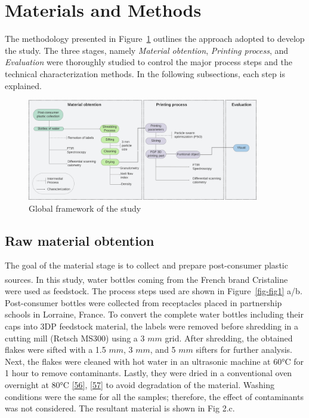 \documentclass[
]{article}
\begin{document}
\hypertarget{materials-and-methods}{%
\section{Materials and Methods}\label{materials-and-methods}}

The methodology presented in Figure~\ref{fig-1} outlines the approach
adopted to develop the study. The three stages, namely \emph{Material
obtention}, \emph{Printing process}, and \emph{Evaluation} were
thoroughly studied to control the major process steps and the technical
characterization methods. In the following subsections, each step is
explained.

\begin{figure}

{\centering \includegraphics[width=0.9\textwidth,height=\textheight]{figures/Fig_1_framework.png}

}

\caption{\label{fig-1}Global framework of the study}

\end{figure}

\hypertarget{raw-material-obtention}{%
\subsection{Raw material obtention}\label{raw-material-obtention}}

The goal of the material stage is to collect and prepare post-consumer
plastic sources. In this study, water bottles coming from the French
brand Cristaline\textsuperscript{\textcopyright} were used as feedstock.
The process steps used are shown in Figure~\ref{fig-fig1} a/b.
Post-consumer bottles were collected from receptacles placed in
partnership schools in Lorraine, France. To convert the complete water
bottles including their caps into 3DP feedstock material, the labels
were removed before shredding in a cutting mill (Retsch MS300) using a 3
\(mm\) grid. After shredding, the obtained flakes were sifted with a 1.5
\(mm\), 3 \(mm\), and 5 \(mm\) sifters for further analysis. Next, the
flakes were cleaned with hot water in an ultrasonic machine at 60°C for
1 hour to remove contaminants. Lastly, they were dried in a conventional
oven overnight at 80°C
\protect\hyperlink{ref-vandevoorde2022}{{[}56{]}},
\protect\hyperlink{ref-taghavi2018}{{[}57{]}} to avoid degradation of
the material. Washing conditions were the same for all the samples;
therefore, the effect of contaminants was not considered. The resultant
material is shown in Fig 2.c.
\end{document}
